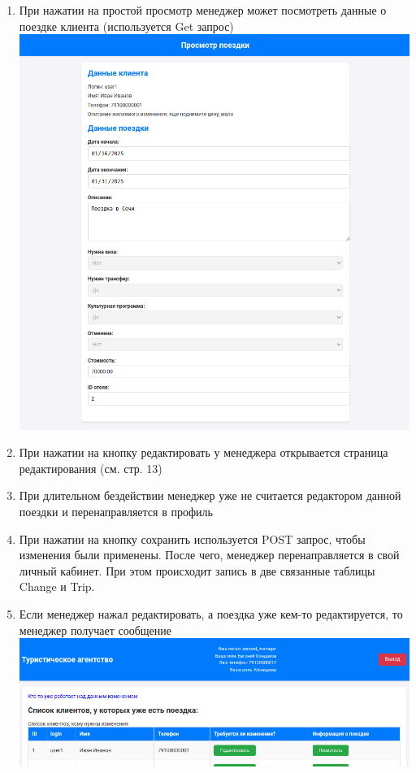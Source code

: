\documentclass[a4paper,12pt]{article}
\begin{document}
\begin{enumerate}
    \item При нажатии на простой просмотр менеджер может посмотреть данные о поездке клиента (используется Get запрос) \\
          \includegraphics[scale=0.5]{media/manager/watch.png} \\
    \item При нажатии на кнопку редактировать у менеджера открывается страница редактирования (см. стр. 13)
    \item При длительном бездействии менеджер уже не считается редактором данной поездки и перенаправляется в профиль
    \item При нажатии на кнопку сохранить используется POST запрос, чтобы изменения были применены.
          После чего, менеджер перенаправляется в свой личный кабинет. При этом происходит запись в две связанные таблицы Change и Trip.
    \item Если менеджер нажал редактировать, а поездка уже кем-то редактируется, то менеджер получает сообщение \\
          \includegraphics[scale=0.5]{media/manager/busy.png} \\

\end{enumerate}
\end{document}
